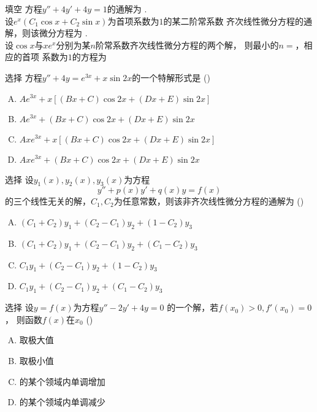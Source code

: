\begin{frame}{填空}
	\linespread{1.5}
	方程$y''+4y'+4y=1$的通解为
	\underline{\;}.\\[1em]
	
	设$e^x(C_1\cos x+C_2\sin x)$为首项系数为$1$的某二阶常系数
	齐次线性微分方程的通解，则该微分方程为
	\underline{\;}.\\[1em]
	
	设$\cos x$与$xe^x$分别为某$n$阶常系数齐次线性微分方程的两个解，
	则最小的$n=$\underline{\;}，相应的首项
	系数为$1$的方程为\underline{\uncover<5->{\;\b{$
	y^{(4)}-2y^{(3)}+2y''-2y'+y=0$}\;}}
	
\end{frame}

\begin{frame}{选择}
	\linespread{1.5}
	方程$y''+4y=e^{3x}+x\sin 2x$的一个特解形式是
	(\underline{\;})
	\begin{enumerate}[(A)]
	  \item $Ae^{3x}+x[(Bx+C)\cos2x+(Dx+E)\sin2x]$
	  \item $Ae^{3x}+(Bx+C)\cos2x+(Dx+E)\sin2x$
	  \item $Axe^{3x}+x[(Bx+C)\cos2x+(Dx+E)\sin2x]$
	  \item $Axe^{3x}+(Bx+C)\cos2x+(Dx+E)\sin2x$
	\end{enumerate}
\end{frame}

\begin{frame}{选择}
	\linespread{1.3}
	设$y_1(x),y_2(x),y_3(x)$为方程
	$$y''+p(x)y'+q(x)y=f(x)$$
	的三个线性无关的解，$C_1,C_2$为任意常数，则该非齐次线性微分方程的通解为
	(\underline{\;})
	\begin{enumerate}[(A)]
	  \item $(C_1+C_2)y_1+(C_2-C_1)y_2+(1-C_2)y_3$
	  \item $(C_1+C_2)y_1+(C_2-C_1)y_2+(C_1-C_2)y_3$
	  \item $C_1y_1+(C_2-C_1)y_2+(1-C_2)y_3$
	  \item $C_1y_1+(C_2-C_1)y_2+(C_1-C_2)y_3$
	\end{enumerate}
\end{frame}

\begin{frame}{选择}
	\linespread{1.3}
	设$y=f(x)$为方程$y''-2y'+4y=0$
	的一个解，若$f(x_0)>0,f'(x_0)=0$，
	则函数$f(x)$在$x_0$
	(\underline{\;})
	\begin{enumerate}[(A)]
	  \item 取极大值
	  \item 取极小值
	  \item 的某个领域内单调增加
	  \item 的某个领域内单调减少
	\end{enumerate}
\end{frame}

